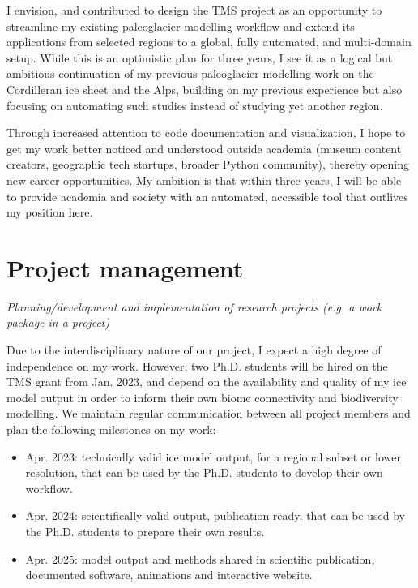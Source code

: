 \documentclass{article}
\newcommand{\guideline}[1]{{\color{color2}\itshape{#1}}}
\begin{document}
    I envision, and contributed to design the TMS project as an opportunity to
    streamline my existing paleoglacier modelling workflow and extend its
    applications from selected regions to a global, fully automated, and
    multi-domain setup. While this is an optimistic plan for three years, I
    see it as a logical but ambitious continuation of my previous paleoglacier
    modelling work on the Cordilleran ice sheet and the Alps, building on my
    previous experience but also focusing on automating such studies instead of
    studying yet another region.

    Through increased attention to code documentation and visualization, I hope
    to get my work better noticed and understood outside academia (museum
    content creators, geographic tech startups, broader Python community),
    thereby opening new career opportunities. My ambition is that within three
    years, I will be able to provide academia and society with an automated,
    accessible tool that outlives my position here.


\section{Project management}

\guideline{
    Planning/development and implementation of research projects (e.g. a work
    package in a project)}

    Due to the interdisciplinary nature of our project, I expect a high degree
    of independence on my work. However, two Ph.D. students will be hired on
    the TMS grant from Jan. 2023, and depend on the availability and quality
    of my ice model output in order to inform their own biome connectivity and
    biodiversity modelling. We maintain regular communication between all
    project members and plan the following milestones on my work:

    \begin{itemize}
      \item Apr. 2023: technically valid ice model output, for a regional
        subset or lower resolution, that can be used by the Ph.D. students to
        develop their own workflow.
      \item Apr. 2024: scientifically valid output, publication-ready, that can
        be used by the Ph.D. students to prepare their own results.
      \item Apr. 2025: model output and methods shared in scientific
        publication, documented software, animations and interactive website.
    \end{itemize}
\end{document}
